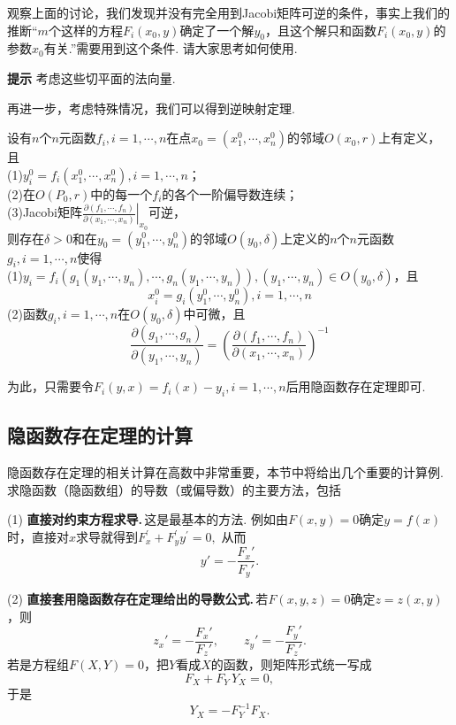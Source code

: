 \documentclass{ctexart}
\newenvironment{custom}[1]{\par\noindent \textbf{#1}\quad}{\par\vspace{1em}}
\begin{document}
观察上面的讨论，我们发现并没有完全用到Jacobi矩阵可逆的条件，事实上我们的推断“$m$个这样的方程$F_{i}(x_{0},y)$确定了一个解$y_{0}$，且这个解只和函数$F_{i}(x_{0},y)$的参数$x_{0}$有关.”需要用到这个条件. 请大家思考如何使用.

\begin{custom}{提示}
考虑这些切平面的法向量.
\end{custom}

再进一步，考虑特殊情况，我们可以得到逆映射定理.
\begin{theorem}[逆映射定理]
设有$n$个$n$元函数$f_{i},i=1,\cdots,n$在点$x_{0}=(x_{1}^{0},\cdots,x_{n}^{0})$的邻域$O(x_{0},r)$上有定义，且\\
(1)$y_{i}^{0}=f_{i}(x_{1}^{0},\cdots,x_{n}^{0}),i=1,\cdots,n$；\\
(2)在$O(P_{0},r)$中的每一个$f_{i}$的各个一阶偏导数连续；\\
(3)Jacobi矩阵$\left.\frac{\partial (f_{1},\cdots,f_{n})}{\partial (x_{1},\cdots,x_{n})}\right|_{x_{0}}$可逆，\\
则存在$\delta>0$和在$y_{0}=(y_{1}^{0},\cdots,y_{n}^{0})$的邻域$O(y_{0},\delta)$上定义的$n$个$n$元函数$g_{i},i=1,\cdots,n$使得\\
(1)$y_{i}=f_{i}(g_{1}(y_{1},\cdots,y_{n}),\cdots,g_{n}(y_{1},\cdots,y_{n})),(y_{1},\cdots,y_{n})\in O(y_{0},\delta)$，且
$$x_{i}^{0}=g_{i}(y_{1}^{0},\cdots,y_{n}^{0}),i=1,\cdots,n$$
(2)函数$g_{i},i=1,\cdots,n$在$O(y_{0},\delta)$中可微，且
$$\frac{\partial (g_{1},\cdots,g_{n})}{\partial (y_{1},\cdots,y_{n})}=\left(\frac{\partial (f_{1},\cdots,f_{n})}{\partial (x_{1},\cdots,x_{n})}\right)^{-1}$$
\end{theorem}
为此，只需要令$F_{i}(y,x)=f_{i}(x)-y_{i},i=1,\cdots,n$后用隐函数存在定理即可.

\subsection{隐函数存在定理的计算}
隐函数存在定理的相关计算在高数中非常重要，本节中将给出几个重要的计算例. 求隐函数（隐函数组）的导数（或偏导数）的主要方法，包括

(1) {\bf 直接对约束方程求导.}\,这是最基本的方法. 例如由$F(x,y)=0$确定$y=f(x)$时，直接对$x$求导就得到$F_{x}^{\prime}+F_{y}^{\prime} y^{\prime}=0,$
从而
\[
y'=-\frac{F_x'}{F_y'}.
\]

(2) {\bf 直接套用隐函数存在定理给出的导数公式.}\,若$F(x,y,z)=0$确定$z=z(x,y)$，则
\[
z_x'=-\frac{F_x'}{F_z'},\qquad z_y'=-\frac{F_y'}{F_z'}.
\]
若是方程组$F(X,Y)=0$，把$Y$看成$X$的函数，则矩阵形式统一写成
\[
F_X+F_Y\,Y_X=0,
\]
于是
\[
Y_X=-F_Y^{-1}F_X.
\]
\end{document}

